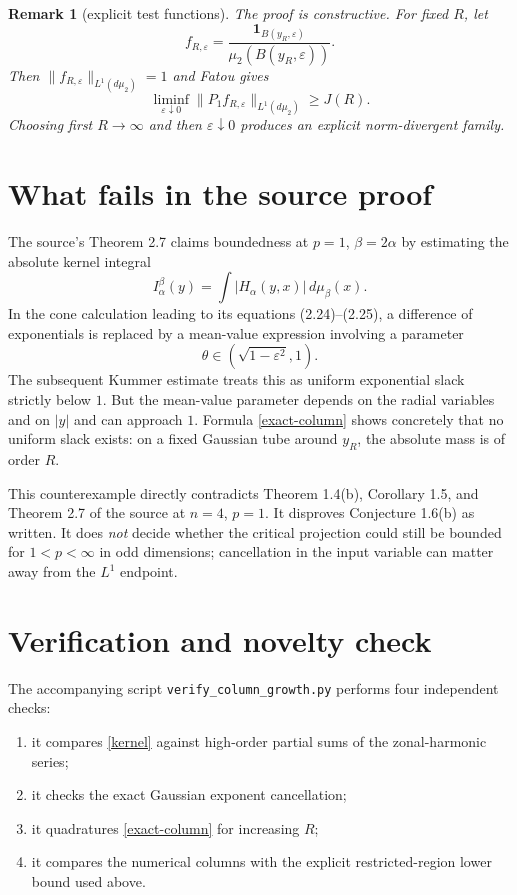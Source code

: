 \documentclass[11pt]{article}
\newtheorem{remark}{Remark}
\newcommand{\dd}{\,d}
\begin{document}
\begin{remark}[explicit test functions]
The proof is constructive.  For fixed $R$, let
\[
 f_{R,\varepsilon}
 =\frac{\mathbf1_{B(y_R,\varepsilon)}}
        {\mu_2(B(y_R,\varepsilon))}.
\]
Then $\|f_{R,\varepsilon}\|_{L^1(d\mu_2)}=1$ and Fatou gives
\[
 \liminf_{\varepsilon\downarrow0}
 \|P_1f_{R,\varepsilon}\|_{L^1(d\mu_2)}\ge J(R).
\]
Choosing first $R\to\infty$ and then $\varepsilon\downarrow0$ produces an
explicit norm-divergent family.
\end{remark}

\section{What fails in the source proof}

The source's Theorem 2.7 claims boundedness at $p=1$, $\beta=2\alpha$ by
estimating the absolute kernel integral
\[
 I_\alpha^\beta(y)=\int |H_\alpha(y,x)|\dd\mu_\beta(x).
\]
In the cone calculation leading to its equations (2.24)--(2.25), a
difference of exponentials is replaced by a mean-value expression involving
a parameter
\[
 \theta\in(\sqrt{1-\varepsilon^2},1).
\]
The subsequent Kummer estimate treats this as uniform exponential slack
strictly below $1$.  But the mean-value parameter depends on the radial
variables and on $|y|$ and can approach $1$.  Formula
\eqref{exact-column} shows concretely that no uniform slack exists: on a
fixed Gaussian tube around $y_R$, the absolute mass is of order $R$.

This counterexample directly contradicts Theorem 1.4(b), Corollary 1.5,
and Theorem 2.7 of the source at $n=4$, $p=1$.  It disproves Conjecture
1.6(b) as written.  It does \emph{not} decide whether the critical projection
could still be bounded for $1<p<\infty$ in odd dimensions; cancellation in
the input variable can matter away from the $L^1$ endpoint.

\section{Verification and novelty check}

The accompanying script \texttt{verify\_column\_growth.py} performs four
independent checks:
\begin{enumerate}
\item it compares \eqref{kernel} against high-order partial sums of the
zonal-harmonic series;
\item it checks the exact Gaussian exponent cancellation;
\item it quadratures \eqref{exact-column} for increasing $R$;
\item it compares the numerical columns with the explicit restricted-region
lower bound used above.
\end{enumerate}
\end{document}
